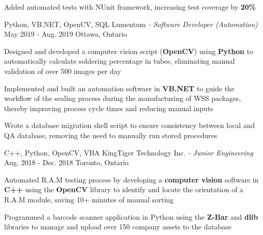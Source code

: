 \begin{siderules}
\begin{cventries}
{\begin{cvitems}
        \item {Added automated tests with NUnit framework, increasing test coverage by \textbf{20\%}}
      \end{cvitems}
    }
    \cventry
      {Python, VB.NET, OpenCV, SQL}
      {Lumentum\hspace{0.15em} \bodyfontlight\itshape{- Software Developer (Automation)}}
      {May 2019 - Aug. 2019}
      {Ottawa, Ontario}
      {
        \begin{cvitems}
          \item {Designed and developed a computer vision script (\textbf{OpenCV}) using \textbf{Python} to automatically calculate soldering percentage in tubes, eliminating manual validation of over 500 images per day}
          \item {Implemented and built an automation software in \textbf{VB.NET} to guide the workflow of the sealing process during the manufacturing of WSS packages, thereby improving process cycle times and reducing manual inputs}
          \item {Wrote a database migration shell script to ensure consistency between local and QA database, removing the need to manually run stored procedures}
        \end{cvitems}
      }
    \cventry
      {C++, Python, OpenCV, VBA}
      {KingTiger Technology Inc.\hspace{0.15em} \bodyfontlight\itshape{- Junior Engineering}}
      {Aug. 2018 - Dec. 2018}
      {Toronto, Ontario}
      {
        \begin{cvitems}
          \item {Automated R.A.M testing process by developing a \textbf{computer vision} software in \textbf{C++} using the \textbf{OpenCV} library to identify and locate the orientation of a R.A.M module, saving 10+ minutes of manual sorting}
          \item {Programmed a barcode scanner application in Python using the \textbf{Z-Bar} and \textbf{dlib} libraries to manage and upload over 150 company assets to the database}
        \end{cvitems}
      }
  \end{cventries}
\end{siderules}
